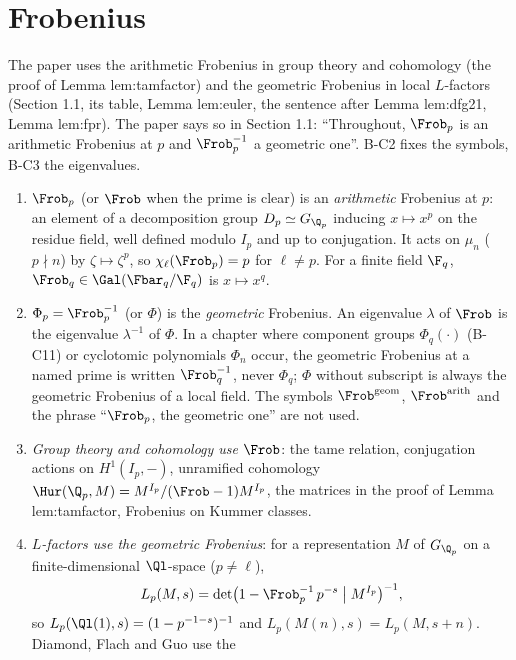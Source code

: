 \section{Frobenius}\label{sec:notation:frobenius}

The paper uses the arithmetic Frobenius in group theory and cohomology (the proof of Lemma lem:tamfactor) and the geometric
Frobenius in local $L$-factors (Section 1.1, its table, Lemma lem:euler, the sentence after Lemma lem:dfg21, Lemma lem:fpr). The
paper says so in Section 1.1: ``Throughout, $\Frob_p$ is an arithmetic Frobenius at $p$ and
$\Frob_p^{-1}$ a geometric one''. B-C2 fixes the symbols, B-C3 the eigenvalues.

\begin{convention}\label{conv:notation:bc2}
\leavevmode
\begin{enumerate}[label=(\alph*)]
\item $\Frob_p$ (or $\Frob$ when the prime is clear) is an \emph{arithmetic} Frobenius at $p$: an element of a decomposition
group $D_p\simeq G_{\Q_p}$ inducing $x\mapsto x^p$ on the residue field, well defined modulo $I_p$ and up to conjugation. It acts on
$\mu_n$ ($p\nmid n$) by $\zeta\mapsto\zeta^p$, so $\chi_\ell(\Frob_p)=p$ for $\ell\ne p$. For a finite field $\F_q$,
$\Frob_q\in\Gal(\Fbar_q/\F_q)$ is $x\mapsto x^q$.
\item $\Phi_p=\Frob_p^{-1}$ (or $\Phi$) is the \emph{geometric} Frobenius. An eigenvalue $\lambda$ of $\Frob$ is the eigenvalue
$\lambda^{-1}$ of $\Phi$. In a chapter where component groups $\Phi_q(\cdot)$ (B-C11) or cyclotomic polynomials $\Phi_n$ occur, the
geometric Frobenius at a named prime is written $\Frob_q^{-1}$, never $\Phi_q$; $\Phi$ without subscript is always the geometric
Frobenius of a local field. The symbols $\Frob^{\mathrm{geom}}$, $\Frob^{\mathrm{arith}}$ and the phrase ``$\Frob_p$, the geometric
one'' are not used.
\item \emph{Group theory and cohomology use $\Frob$}: the tame relation, conjugation actions on $H^1(I_p,-)$, unramified
cohomology $\Hur(\Q_p,M)=M^{I_p}/(\Frob-1)M^{I_p}$, the matrices in the proof of Lemma lem:tamfactor, Frobenius on Kummer classes.
\item \emph{$L$-factors use the geometric Frobenius}: for a representation $M$ of $G_{\Q_p}$ on a finite-dimensional
$\Ql$-space ($p\ne\ell$),
\[
L_p(M,s)=\det\bigl(1-\Frob_p^{-1}\,p^{-s}\bigm|M^{I_p}\bigr)^{-1},
\]
so $L_p(\Ql(1),s)=(1-p^{-1-s})^{-1}$ and $L_p(M(n),s)=L_p(M,s+n)$. Diamond, Flach and Guo \cite[1.1.1, 1.7.2]{DFG04} use the

\end{enumerate}
\end{convention}
